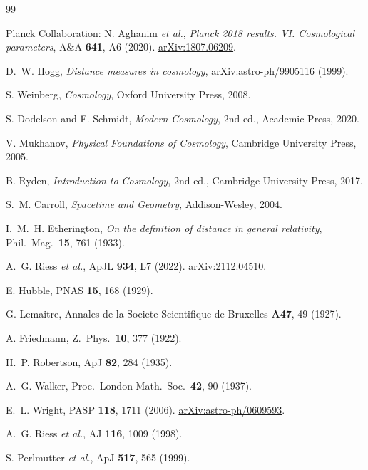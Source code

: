 \documentclass[11pt,a4paper,openany]{report}
\begin{document}
\begin{thebibliography}{99}

Planck Collaboration: N. Aghanim \emph{et al.},
\textit{Planck 2018 results. VI. Cosmological parameters},
A\&A \textbf{641}, A6 (2020).
\href{https://arxiv.org/abs/1807.06209}{arXiv:1807.06209}.

D.~W. Hogg, \textit{Distance measures in cosmology},
arXiv:astro-ph/9905116 (1999).

S. Weinberg, \textit{Cosmology}, Oxford University Press, 2008.

S. Dodelson and F. Schmidt, \textit{Modern Cosmology}, 2nd ed.,
Academic Press, 2020.

V. Mukhanov, \textit{Physical Foundations of Cosmology},
Cambridge University Press, 2005.

B. Ryden, \textit{Introduction to Cosmology}, 2nd ed.,
Cambridge University Press, 2017.

S.~M. Carroll, \textit{Spacetime and Geometry}, Addison-Wesley, 2004.

I.~M.~H. Etherington,
\textit{On the definition of distance in general relativity},
Phil.\ Mag.\ \textbf{15}, 761 (1933).

A.~G. Riess \emph{et al.}, ApJL \textbf{934}, L7 (2022).
\href{https://arxiv.org/abs/2112.04510}{arXiv:2112.04510}.

E. Hubble, PNAS \textbf{15}, 168 (1929).

G. Lemaitre,
Annales de la Societe Scientifique de Bruxelles \textbf{A47}, 49 (1927).

A. Friedmann, Z.\ Phys.\ \textbf{10}, 377 (1922).

H.~P. Robertson, ApJ \textbf{82}, 284 (1935).

A.~G. Walker, Proc.\ London Math.\ Soc.\ \textbf{42}, 90 (1937).

E.~L. Wright, PASP \textbf{118}, 1711 (2006).
\href{https://arxiv.org/abs/astro-ph/0609593}{arXiv:astro-ph/0609593}.

A.~G. Riess \emph{et al.}, AJ \textbf{116}, 1009 (1998).

S. Perlmutter \emph{et al.}, ApJ \textbf{517}, 565 (1999).


\end{thebibliography}
\end{document}

